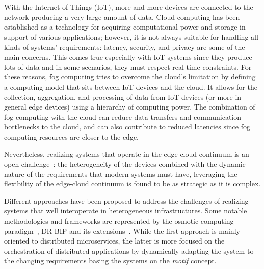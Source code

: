 \chapter{\introductionname}
\label{chap:introduction}

With the Internet of Things (IoT), more and more devices are connected to the network producing a very large amount of data.
Cloud computing has been established as a technology for acquiring computational power and storage in support of various applications;
however, it is not always suitable for handling all kinds of systems' requirements: latency, security, and privacy are some of the main
concerns. This comes true especially with IoT systems since they produce lots of data and in some scenarios, they must respect real-time constraints.
For these reasons, fog computing tries to overcome the cloud's limitation by defining a computing model that sits between IoT devices and the cloud.
It allows for the collection, aggregation, and processing of data from IoT devices (or more in general edge devices) using a hierarchy of computing
power.
The combination of fog computing with the cloud can reduce data transfers and communication bottlenecks to the cloud, and can also contribute to
reduced latencies since fog computing resources are closer to the edge.

Nevertheless, realizing systems that operate in the edge-cloud continuum is an open challenge~\cite{BITTENCOURT2018134}:
the heterogeneity of the devices combined with the dynamic nature of the requirements that modern systems must have, leveraging the flexibility of
the edge-cloud continuum is found to be as strategic as it is complex.

Different approaches have been proposed to address the challenges of realizing systems that well interoperate in heterogeneous
infrastructures. Some notable methodologies and frameworks are represented by the osmotic computing paradigm~\cite{8781958}, DR-BIP and its
extensions~\cite{10.1007/978-3-030-03424-5_20,10.1007/978-3-642-30564-1_1,de2020dream}.
While the first approach is mainly oriented to distributed microservices, the latter is more focused on the orchestration of distributed
applications by dynamically adapting the system to the changing requirements basing the systems on the \emph{motif} concept.

